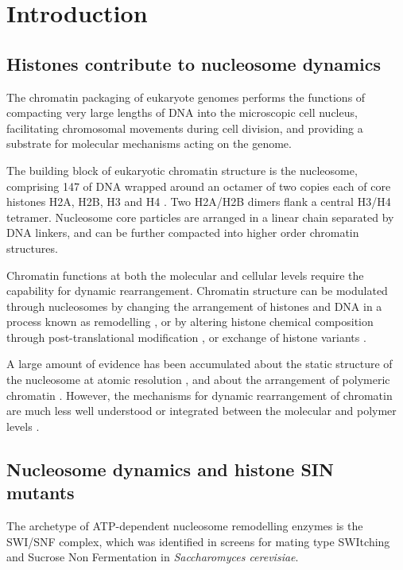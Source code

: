 \section{Introduction}

  \subsection{Histones contribute to nucleosome dynamics}

    The chromatin packaging of eukaryote genomes performs the
    functions of compacting very large lengths of DNA into the
    microscopic cell nucleus, facilitating chromosomal movements
    during cell division, and providing a substrate for molecular
    mechanisms acting on the genome.

    The building block of eukaryotic chromatin structure is the
    nucleosome, comprising \SI{147}{\bp} of DNA wrapped around an
    octamer of two copies each of core histones H2A, H2B, H3 and H4 \citep{luger1997crystal}. 
    Two H2A/H2B dimers flank a central H3/H4 tetramer.
    Nucleosome core particles are arranged
    in a linear chain separated by DNA linkers, and can be further
    compacted into higher order chromatin structures.

    Chromatin functions at both the molecular and cellular levels
    require the capability for dynamic rearrangement.  Chromatin
    structure can be modulated through nucleosomes by changing the
    arrangement of histones and DNA in a process known as remodelling
    \citep{flaus2011mechanisms}, or by altering histone chemical
    composition through post-translational modification
    \citep{bannister2011ptm-review}, or exchange of histone variants
    \citep{TalbertHenikoff2010}.

    A large amount of evidence has been accumulated about the static
    structure of the nucleosome at atomic resolution , and
    about the arrangement of polymeric chromatin .
    However, the mechanisms for dynamic rearrangement of chromatin are
    much less well understood or integrated between the molecular and
    polymer levels .

  \subsection{Nucleosome dynamics and histone SIN mutants}

    The archetype of ATP-dependent nucleosome remodelling enzymes is
    the SWI/SNF complex, which was identified in screens for mating
    type SWItching \citep{SWI-mutants} and Sucrose Non Fermentation
    \citep{SNF-mutants-original-discovery, SNF-mutants2} in
    \textit{Saccharomyces cerevisiae}.

